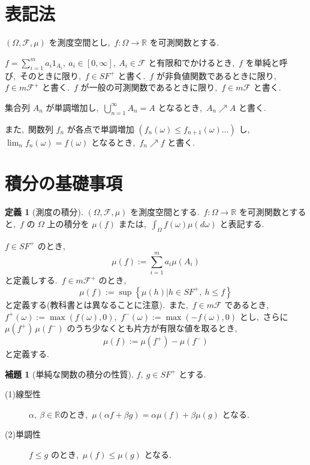 \documentclass[a4j,11pt]{jarticle}
\theoremstyle{definition}
\newtheorem{definition}[theorem]{定義}
\newtheorem{lemma}[theorem]{補題}
\begin{document}
\section*{表記法}
  $(\Omega,\mathcal{F},\mu)$
  を測度空間とし,\ 
  $f:\Omega \to \mathbb{R}$
  を可測関数とする.\ 

  $f = \sum_{i=1}^m a_i 1_{A_i},\ a_i \in \left[ 0, \infty\right],\ A_i \in \mathcal{F}$
  と有限和でかけるとき,\ 
  $f$
  を単純と呼び,\ そのときに限り,\ 
  $f \in SF^+$
  と書く.\ 
  $f$
  が非負値関数であるときに限り,\ 
  $f \in m\mathcal{F}^+$
  と書く.\ 
  $f$
  が一般の可測関数であるときに限り,\ 
  $f \in m\mathcal{F}$
  と書く.\ 

  集合列
  $A_n$
  が単調増加し,\ 
  $\bigcup_{n=1}^{\infty} A_n = A$
  となるとき,\ 
  $A_n \nearrow A$
  と書く.\ 

  また,\ 関数列
  $f_n$
  が各点で単調増加
  $(f_n(\omega) \leq f_{n+1}(\omega) \ldots)$
  し,\ 
  $\lim_{n} f_n(\omega) = f(\omega)$
  となるとき,\ 
  $f_n \nearrow f$
  と書く.\ 

\section*{積分の基礎事項}
\begin{definition}[測度の積分]
  $(\Omega,\mathcal{F},\mu)$
  を測度空間とする.\ 
  $f:\Omega \to \mathbb{R}$
  を可測関数とすると,\ 
  $f$
  の
  $\Omega$
  上の積分を
  $\mu (f)$
  または,\ 
  $\int_{\Omega} f(\omega) \mu (d\omega)$
  と表記する.\ 

  $f \in SF^+$
  のとき,\ 
  \begin{equation}
    \mu (f) := \sum_{i=1}^m a_i \mu(A_i)
  \end{equation}
  と定義しする.\  
  $f \in m\mathcal{F}^+$
  のとき,\ 
  \begin{equation}
    \mu(f) := \sup\left\{ \mu(h) | h \in SF^+,\ h \leq f\right\}
  \end{equation}
  と定義する(教科書とは異なることに注意).\ 
  また,\ 
  $f\in m\mathcal{F}$
  であるとき,\ 
  $f^+(\omega) := \max(f(\omega),0)$,\ 
  $f^-(\omega) := \max(-f(\omega),0)$
  とし,\ さらに
  $\mu(f^+)\, \mu(f^-)$
  のうち少なくとも片方が有限な値を取るとき,\ 
  \begin{equation}
    \mu(f) := \mu(f^+) - \mu(f^-)
  \end{equation}
  と定義する.\ 
\end{definition}

\begin{lemma}[単純な関数の積分の性質]\label{lemma:int_nature}
  $f,\ g \in SF^+$
  とする.\ 
  \begin{description}
    \item[(1)線型性]
      $\alpha,\ \beta \in \mathbb{R}$のとき,\ 
      $\mu(\alpha f + \beta g) = \alpha \mu(f) + \beta \mu(g)$
      となる.\ 
    \item[(2)単調性]
      $f \leq g$
      のとき,\ 
      $\mu(f) \leq \mu(g)$
      となる.\ 
  \end{description}
\end{lemma}
\end{document}
